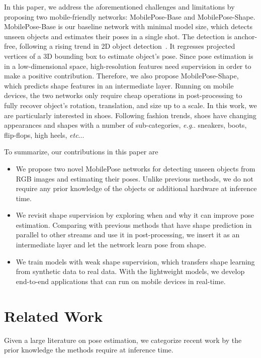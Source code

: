 \documentclass[runningheads]{llncs}
\makeatletter
\DeclareRobustCommand\onedot{\futurelet\@let@token\@onedot}
\def\@onedot{\ifx\@let@token.\else.\null\fi\xspace}
\def\eg{\emph{e.g}\onedot} \def\Eg{\emph{E.g}\onedot}
\def\etc{\emph{etc}\onedot} \def\vs{\emph{vs}\onedot}
\makeatother
\begin{document}
In this paper, we address the aforementioned challenges and limitations by proposing two mobile-friendly networks: MobilePose-Base and MobilePose-Shape. 
MobilePose-Base is our baseline network with minimal model size, which detects unseen objects and estimates their poses in a single shot. The detection is anchor-free, following a rising trend in 2D object detection~\cite{Law_2018_CornerNet,Duan_2019_CenterNet,Zhou_2019_CenterNet}. It regresses projected vertices of a 3D bounding box to estimate object's pose. Since pose estimation is in a low-dimensional space, high-resolution features need supervision in order to make a positive contribution. Therefore, we also propose MobilePose-Shape, which predicts shape features in an intermediate layer. Running on mobile devices, the two networks only require cheap operations in post-processing to fully recover object's rotation, translation, and size up to a scale. In this work, we are particularly interested in shoes. Following fashion trends, shoes have changing appearances and shapes with a number of sub-categories, \eg sneakers, boots, flip-flops, high heels, \etc.

To summarize, our contributions in this paper are
\begin{itemize}
    \item We propose two novel MobilePose networks for detecting unseen objects from RGB images and estimating their poses. Unlike previous methods, we do not require any prior knowledge of the objects or additional hardware at inference time.
    \item We revisit shape supervision by exploring when and why it can improve pose estimation. Comparing with previous methods that have shape prediction in parallel to other streams and use it in post-processing, we insert it as an intermediate layer and let the network learn pose from shape.
    \item We train models with weak shape supervision, which transfers shape learning from synthetic data to real data. With the lightweight models, we develop end-to-end applications that can run on mobile devices in real-time. 
\end{itemize}

\section{Related Work}
Given a large literature on pose estimation, we categorize recent work by the prior knowledge the methods require at inference time. 
\end{document}
